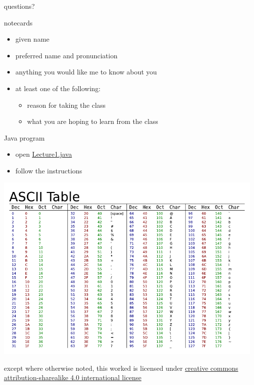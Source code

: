 \documentclass[10pt]{beamer}
\begin{document}
  \begin{frame}[standout]
    questions?
  \end{frame}

  \appendix

  \begin{frame}{notecards}
    \begin{itemize}
      \item given name
      \item preferred name and pronunciation
      \item anything you would like me to know about you
      \item at least one of the following:
        \begin{itemize}
          \item reason for taking the class
          \item what you are hoping to learn from the class
        \end{itemize}
    \end{itemize}
  \end{frame}

  \begin{frame}{Java program}
    \begin{itemize}
      \item open \href{https://csbsju.instructure.com/courses/7691/pages/lecture1-dot-java}{Lecture1.java}
      \item follow the instructions
    \end{itemize}
  \end{frame}

  \begin{frame}
    \includegraphics[width=\textwidth]{Ascii-proper-color}
  \end{frame}

  \begin{frame}
    \begin{center}\ccbysa\end{center}

    except where otherwise noted, this worked is licensed under
    \href{http://creativecommons.org/licenses/by-sa/4.0/}{creative commons
    attribution-sharealike 4.0 international license}
  \end{frame}
\end{document}
